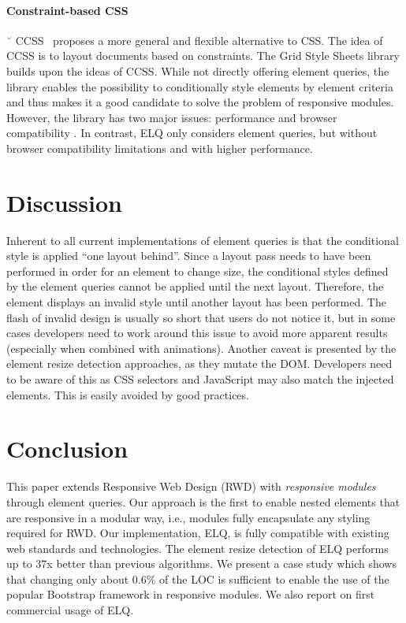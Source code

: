 \documentclass[sigplan,9pt]{acmart}
\newcommand{\elq}{ELQ}
\begin{document}
  \paragraph{Constraint-based CSS}˘
  CCSS~\cite{badros1999constraint} proposes a more general and flexible alternative to CSS.
  The idea of CCSS is to layout documents based on constraints.
  The Grid Style Sheets library \cite{eq_imp_gss} builds upon the ideas of CCSS.
  While not directly offering element queries, the library enables the possibility to conditionally style elements by element criteria and thus makes it a good candidate to solve the problem of responsive modules.
  However, the library has two major issues: performance and browser compatibility \cite{gss_issue}.
  In contrast, \elq{} only considers element queries, but without browser compatibility limitations and with higher performance.

  \section{Discussion}\label{sec:discussion}
      Inherent to all current implementations of element queries is that the conditional style is applied ``one layout behind''.
      Since a layout pass needs to have been performed in order for an element to change size, the conditional styles defined by the element queries cannot be applied until the next layout.
      Therefore, the element displays an invalid style until another layout has been performed.
      The flash of invalid design is usually so short that users do not notice it, but in some cases developers need to work around this issue to avoid more apparent results (especially when combined with animations).
      Another caveat is presented by the element resize detection approaches, as they mutate the DOM.
      Developers need to be aware of this as CSS selectors and JavaScript may also match the injected elements.
      This is easily avoided by good practices.

  \section{Conclusion}\label{sec:conclusion}
    This paper extends Responsive Web Design (RWD) with {\em responsive
      modules} through element queries.  Our approach is the first to
    enable nested elements that are responsive in a modular way, i.e.,
    modules fully encapsulate any styling required for RWD.  Our
    implementation, \elq{}, is fully compatible with existing web
    standards and technologies. The element resize detection of \elq{}
    performs up to 37x better than previous algorithms.  We present a
    case study which shows that changing only about 0.6\% of the LOC is
    sufficient to enable the use of the popular Bootstrap framework in
    responsive modules.  We also report on first commercial usage of
    \elq{}.



\end{document}

